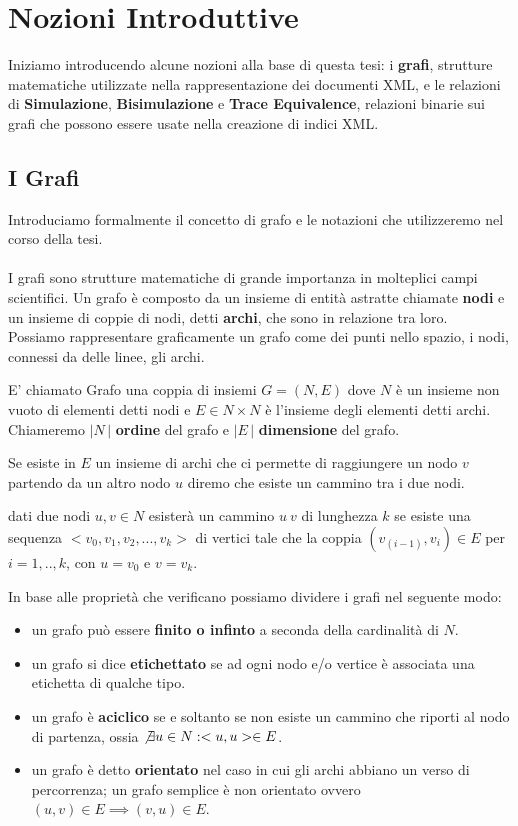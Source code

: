 \chapter{Nozioni Introduttive}
Iniziamo introducendo alcune nozioni alla base di questa tesi: i \textbf{grafi}, strutture matematiche utilizzate nella rappresentazione dei documenti XML, e le relazioni di \textbf{Simulazione}, \textbf{Bisimulazione} e \textbf{Trace Equivalence}, relazioni binarie sui grafi che possono essere usate nella creazione di indici XML.

\section{I Grafi}
Introduciamo formalmente il concetto di grafo e le notazioni che utilizzeremo nel corso della tesi.
\\\\
I grafi sono strutture matematiche di grande importanza in molteplici campi scientifici. Un grafo è composto da un insieme di entità astratte chiamate \textbf{nodi} e un insieme di coppie di nodi, detti \textbf{archi}, che sono in relazione tra loro.\\
Possiamo rappresentare graficamente un grafo come dei punti nello spazio, i nodi, connessi da delle linee, gli archi.

\begin{definition}[Grafo]
E' chiamato Grafo una coppia di insiemi $G = (N,E)$ dove $N$ è un insieme non vuoto di elementi detti nodi e $E \in N \times N $ è l'insieme degli elementi detti archi. Chiameremo $|N\,|$ \textbf{ordine} del grafo e $|E\,|$ \textbf{dimensione} del grafo.
\end{definition}

Se esiste in $E$ un insieme di archi che ci permette di raggiungere un nodo $v$ partendo da un altro nodo $u$ diremo che esiste un cammino tra i due nodi.

\begin{definition}[Cammino]
dati due nodi $u,v \in N$ esisterà un cammino $u ~ v$ di lunghezza $k$ se esiste una sequenza $<v_0,v_1,v_2,...,v_k>$ di vertici tale che la coppia $(v_(i-1),v_i) \in E$ per $i = 1,..,k$, con $u = v_0$ e $v = v_k$. 
\end{definition}

In base alle proprietà che verificano possiamo dividere i grafi nel seguente modo:

\begin{itemize}
\item un grafo può essere \textbf{finito o infinto} a seconda della cardinalità di $N$.
\item un grafo si dice \textbf{etichettato} se ad ogni nodo e/o vertice è associata una etichetta di qualche tipo.
\item un grafo è \textbf{aciclico} se e soltanto se non esiste un cammino che riporti al nodo di partenza, ossia $\not\exists u \in N: <u,u> \in E$.
\item un grafo è detto \textbf{orientato} nel caso in cui gli archi abbiano un verso di percorrenza; un grafo semplice è non orientato ovvero $(u,v)\in E \implies (v,u) \in E$.
\end{itemize}

